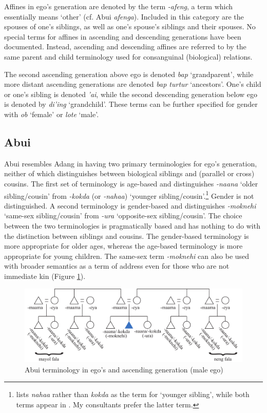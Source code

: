 Affines in ego's generation are denoted by the term \textit{{}-afeng}, a term which essentially means `other' (cf. Abui \textit{afenga}). Included in this category are the spouses of one's siblings, as well as one's spouse's siblings and their spouses. No special terms for affines in ascending and descending generations have been documented. Instead, ascending and descending affines are referred to by the same parent and child terminology used for consanguinal (biological) relations. 

The second ascending generation above ego is denoted \textit{bap} `grandparent', while more distant ascending generations are denoted \textit{bap turtur} `ancestors'. One's  child or one's sibling is denoted \textit{'ai}, while the second descending generation below ego is denoted by \textit{di'ing} `grandchild'. These terms can be further specified for gender with \textit{ob} `female' or \textit{lote} `male'. 

 
\subsection{Abui}\label{sect_abui}
Abui resembles Adang in having two primary terminologies for ego's generation, neither of which distinguishes between biological siblings and (parallel or cross) cousins. The first set of terminology is age-based and distinguishes \textit{-naana} `older sibling/cousin' from \textit{-kokda} (or \textit{-nahaa}) `younger sibling/cousin'.\footnote{\citet[56]{Nicolspeyer1940} lists \textit{nahaa} rather than \textit{kokda} as the term for `younger sibling', while both terms appear in \citet{KratochvilEtAl2008kamus}. My consultants prefer the latter term.}  Gender is not distinguished. A second terminology is gender-based and distinguishes \textit{-moknehi} `same-sex sibling/cousin' from \textit{-ura} `opposite-sex sibling/cousin'. The choice between the two terminologies is pragmatically based and has nothing to do with the distinction between siblings and cousins. The gender-based terminology is more appropriate for older ages, whereas the age-based terminology is more appropriate for young children. The same-sex term \textit{-moknehi} can also be used with broader semantics as a term of address even for those who are not immediate kin (Figure \ref{fig:5:10}).

\begin{figure}[h]
\includegraphics[width=\textwidth]{figures/Holton_ch5_fig10.pdf}
\caption{Abui terminology in ego's and ascending generation (male ego)}
\label{fig:5:10}
\end{figure}  

